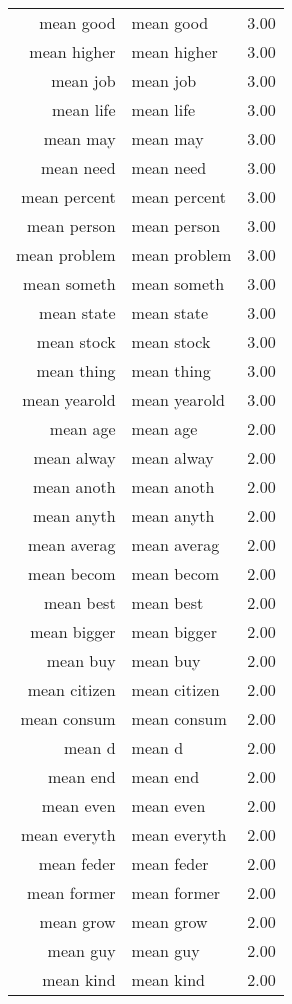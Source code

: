\begin{table}[ht]
\begin{tabular}{rlr}
  mean good & mean good & 3.00 \\ 
  mean higher & mean higher & 3.00 \\ 
  mean job & mean job & 3.00 \\ 
  mean life & mean life & 3.00 \\ 
  mean may & mean may & 3.00 \\ 
  mean need & mean need & 3.00 \\ 
  mean percent & mean percent & 3.00 \\ 
  mean person & mean person & 3.00 \\ 
  mean problem & mean problem & 3.00 \\ 
  mean someth & mean someth & 3.00 \\ 
  mean state & mean state & 3.00 \\ 
  mean stock & mean stock & 3.00 \\ 
  mean thing & mean thing & 3.00 \\ 
  mean yearold & mean yearold & 3.00 \\ 
  mean age & mean age & 2.00 \\ 
  mean alway & mean alway & 2.00 \\ 
  mean anoth & mean anoth & 2.00 \\ 
  mean anyth & mean anyth & 2.00 \\ 
  mean averag & mean averag & 2.00 \\ 
  mean becom & mean becom & 2.00 \\ 
  mean best & mean best & 2.00 \\ 
  mean bigger & mean bigger & 2.00 \\ 
  mean buy & mean buy & 2.00 \\ 
  mean citizen & mean citizen & 2.00 \\ 
  mean consum & mean consum & 2.00 \\ 
  mean d & mean d & 2.00 \\ 
  mean end & mean end & 2.00 \\ 
  mean even & mean even & 2.00 \\ 
  mean everyth & mean everyth & 2.00 \\ 
  mean feder & mean feder & 2.00 \\ 
  mean former & mean former & 2.00 \\ 
  mean grow & mean grow & 2.00 \\ 
  mean guy & mean guy & 2.00 \\ 
  mean kind & mean kind & 2.00 \\ 

\end{tabular}
\end{table}
